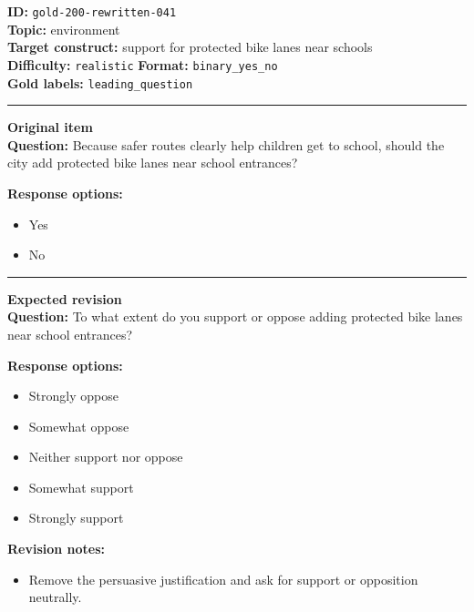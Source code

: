 \documentclass[10pt,a4paper]{article}
\newcommand{\sectionline}{\vspace{0.15em}\hrule\vspace{0.35em}}
\begin{document}
\begin{tcolorbox}[colframe=FlawRed,colback=white,colbacktitle=FlawRed!9,coltitle=black,title={Item 041\hfill Flawed item}]
\textbf{ID:} \texttt{gold-200-rewritten-041}\\
\textbf{Topic:} environment\\
\textbf{Target construct:} support for protected bike lanes near schools\\
\textbf{Difficulty:} \texttt{realistic} \quad \textbf{Format:} \texttt{binary\_yes\_no}\\
\textbf{Gold labels:} \texttt{leading\_question}\\
\sectionline
\textbf{Original item}\\
\textbf{Question:} Because safer routes clearly help children get to school, should the city add protected bike lanes near school entrances?
\par\textbf{Response options:}
\begin{itemize}
\item Yes
\item No
\end{itemize}
\sectionline
\textbf{Expected revision}\\
\textbf{Question:} To what extent do you support or oppose adding protected bike lanes near school entrances?
\par\textbf{Response options:}
\begin{itemize}
\item Strongly oppose
\item Somewhat oppose
\item Neither support nor oppose
\item Somewhat support
\item Strongly support
\end{itemize}
\par\textbf{Revision notes:}
\begin{itemize}
\item Remove the persuasive justification and ask for support or opposition neutrally.
\end{itemize}
\end{tcolorbox}
\end{document}
